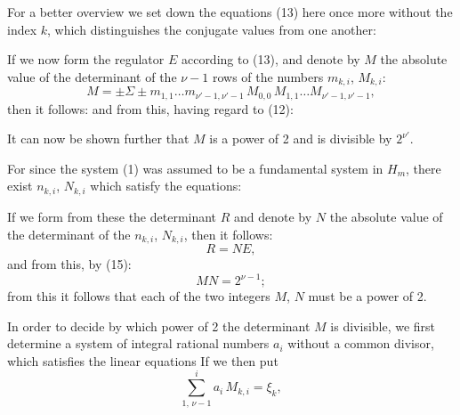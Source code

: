 
For a better overview we set down the equations (13) here once
more without the index $k$, which distinguishes the conjugate values
from one another:

If we now form the regulator $E$ according to (13), and denote
by $M$ the absolute value of the determinant of the $\nu-1$ rows
of the numbers $m_{k,i}$, $M_{k,i}$:
\[
M = \pm \Sigma \pm m_{1,1} \ldots m_{\nu'-1,\nu'-1}\, M_{0,0}\, M_{1,1} \ldots M_{\nu'-1,\nu'-1},
\]
then it follows:
and from this, having regard to (12):

It can now be shown further that $M$ is a power of 2 and is
divisible by $2^{\nu'}$.

For since the system (1) was assumed to be a fundamental system
in $H_m$, there exist 
$n_{k,i}$, $N_{k,i}$ which satisfy the equations:

If we form from these the determinant $R$ and denote by $N$
the absolute value of the determinant of the $n_{k,i}$, $N_{k,i}$, then it follows:
\[
R = N E,
\]
and from this, by (15):
\[
M N = 2^{\nu-1};
\]
from this it follows that each of the two integers $M$, $N$ must
be a power of 2.

In order to decide by which power of 2 the determinant
$M$ is divisible, we first determine a system of integral
rational numbers $a_i$ without a common divisor, which satisfies
the linear equations
If we then put
\[
\sum\limits_{1,\, \nu-1}^{i} a_i\, M_{k,i} = \xi_k,
\]
